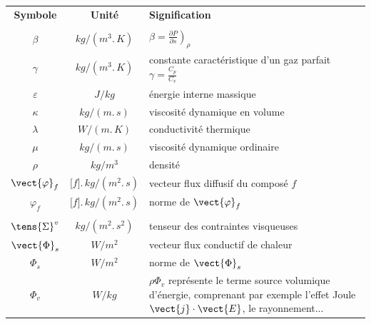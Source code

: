 \newpage

\begin{table}[htp]
\begin{tabular}{ccp{}}

{\bf Symbole} & {\bf Unité} & {\bf Signification}\\

\phantom{$C_v$, ${C_v}_i$} & \phantom{$\lbrack f\rbrack.\,kg/(m^3.\,s)$} & \\

$\beta$         & $kg/(m^3.\,K)$ &
        $\beta = \left.\frac{\partial P}{\partial s}\right)_\rho$\\
$\gamma$         & $kg/(m^3.\,K)$ & constante caractéristique
                                        d'un gaz parfait
                                        $\gamma = \frac{C_p}{C_v}$\\
$\varepsilon$         & $J/kg$         & énergie interne massique\\
$\kappa$         & $kg/(m.\,s)$         & viscosité dynamique en volume\\
$\lambda$         & $W/(m.\,K)$         & conductivité thermique\\
$\mu$                 & $kg/(m.\,s)$         & viscosité dynamique ordinaire\\
$\rho$                 & $kg/m^3$         & densité\\
$\vect{\varphi}_f$
                & $\lbrack f\rbrack.\,kg/(m^2.\,s)$
                                & vecteur flux diffusif du composé $f$\\
$\varphi_f$         & $\lbrack f\rbrack.\,kg/(m^2.\,s)$
                                & norme de $\vect{\varphi}_f$\\

\phantom{ouden}        &                 & \\

$\tens{\Sigma}^v$ &$kg/(m^2.\,s^2)$& tenseur des contraintes visqueuses\\
$\vect{\Phi}_s$ & $W/m^2$        & vecteur flux conductif de chaleur\\
$\Phi_s$         & $W/m^2$         & norme de $\vect{\Phi}_s$\\
$\Phi_v$         & $W/kg$         & $\rho\Phi_v$ représente le terme
                                        source volumique d'énergie,
                                        comprenant par exemple
                                        l'effet Joule $\vect{j}\cdot\vect{E}$,
                                        le rayonnement...\\
\end{tabular}
\end{table}
\clearpage

